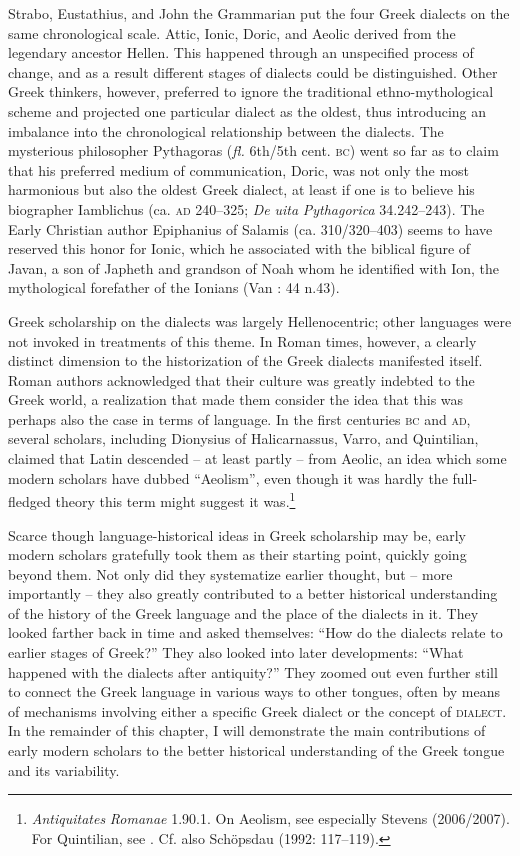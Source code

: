 \documentclass[output=paper]{langsci/langscibook}
\begin{document}
Strabo, Eustathius, and John the Grammarian put the four Greek dialects on the same chronological scale. Attic, Ionic, Doric, and Aeolic derived from the legendary ancestor Hellen. This happened through an unspecified process of change, and as a result different stages of dialects could be distinguished. Other Greek thinkers, however, preferred to ignore the traditional ethno-mythological scheme and projected one particular dialect as the oldest, thus introducing an imbalance into the chronological relationship between the dialects. The mysterious philosopher Pythagoras (\textit{fl.} 6th/5th cent. \textsc{bc}) went so far as to claim that his preferred medium of communication, Doric, was not only the most harmonious but also the oldest Greek dialect, at least if one is to believe his biographer Iamblichus (ca. \textsc{ad} 240–325; \textit{De} \textit{uita} \textit{Pythagorica} 34.242–243). The Early Christian author Epiphanius of Salamis (ca. 310/320–403) seems to have reserved this honor for Ionic, which he associated with the biblical figure of Javan, a son of Japheth and grandson of Noah whom he identified with Ion, the mythological forefather of the Ionians (Van \citealt{Rooy2013}: 44 n.43).

Greek scholarship on the dialects was largely Hellenocentric; other languages were not invoked in treatments of this theme. In Roman times, however, a clearly distinct dimension to the historization of the Greek dialects manifested itself. Roman authors acknowledged that their culture was greatly indebted to the Greek world, a realization that made them consider the idea that this was perhaps also the case in terms of language. In the first centuries \textsc{bc} and \textsc{ad}, several scholars, including Dionysius of Halicarnassus, Varro, and Quintilian, claimed that Latin descended – at least partly – from Aeolic, an idea which some modern scholars have dubbed “Aeolism”, even though it was hardly the full-fledged theory this term might suggest it was.\footnote{\textit{Antiquitates} \textit{Romanae} 1.90.1. On Aeolism, see especially Stevens (2006/2007). For Quintilian, see \citet[149]{Fögen2000}. Cf. also Schöpsdau (1992: 117–119).}

Scarce though language-historical ideas in Greek scholarship may be, early modern scholars gratefully took them as their starting point, quickly going beyond them. Not only did they systematize earlier thought, but – more importantly – they also greatly contributed to a better historical understanding of the history of the Greek language and the place of the dialects in it. They looked farther back in time and asked themselves: “How do the dialects relate to earlier stages of Greek?” They also looked into later developments: “What happened with the dialects after antiquity?” They zoomed out even further still to connect the Greek language in various ways to other tongues, often by means of mechanisms involving either a specific Greek dialect or the concept of \textsc{dialect}. In the remainder of this chapter, I will demonstrate the main contributions of early modern scholars to the better historical understanding of the Greek tongue and its variability.
\end{document}
